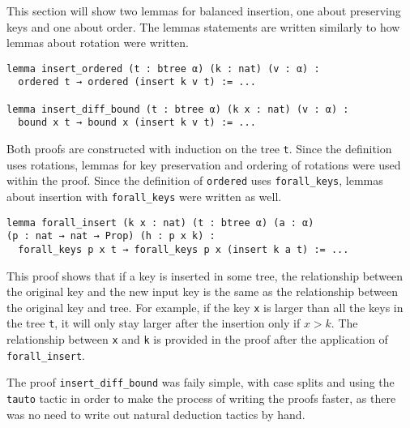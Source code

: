 This section will show two lemmas for balanced insertion, one about preserving keys and one about order. The lemmas statements are written similarly to how lemmas about rotation were written.

\begin{lstlisting}
lemma insert_ordered (t : btree α) (k : nat) (v : α) :
  ordered t → ordered (insert k v t) := ...

lemma insert_diff_bound (t : btree α) (k x : nat) (v : α) :
  bound x t → bound x (insert k v t) := ...
\end{lstlisting}

Both proofs are constructed with induction on the tree \lstinline{t}. Since the definition uses rotations, lemmas for key preservation and ordering of rotations were used within the proof. Since the definition of \lstinline{ordered} uses \lstinline{forall_keys}, lemmas about insertion with \lstinline{forall_keys} were written as well.

\begin{lstlisting}
lemma forall_insert (k x : nat) (t : btree α) (a : α) 
(p : nat → nat → Prop) (h : p x k) :
  forall_keys p x t → forall_keys p x (insert k a t) := ...
\end{lstlisting}

This proof shows that if a key is inserted in some tree, the relationship between the original key and the new input key is the same as the relationship between the original key and tree. For example, if the key \lstinline{x} is larger than all the keys in the tree \lstinline{t}, it will only stay larger after the insertion only if $x > k$. The relationship between \lstinline{x} and \lstinline{k} is provided in the proof after the application of \lstinline{forall_insert}.

The proof \lstinline{insert_diff_bound} was faily simple, with case splits and using the \lstinline{tauto} tactic in order to make the process of writing the proofs faster, as there was no need to write out natural deduction tactics by hand.

